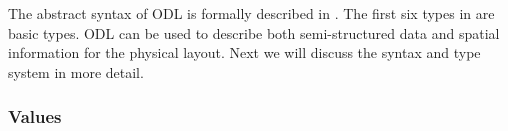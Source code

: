 The abstract syntax of ODL is formally described in .
The first six types in  are basic types. 
ODL can be used to describe both semi-structured data and 
spatial information for the physical layout. Next we 
will discuss the 
syntax and type system in more detail. 

\subsubsection{Values}



